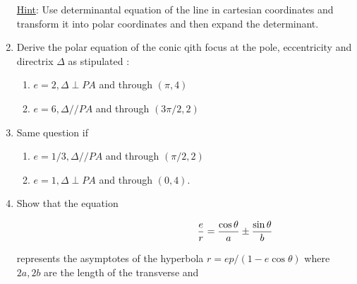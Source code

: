 \documentclass[11pt]{amsbook}
\begin{document}
\begin{enumerate}
\begin{equation*}
\end{equation*}


\underline{Hint}: Use determinantal  equation of the line in cartesian
coordinates 
and  transform it into polar coordinates and
 then expand the determinant. 

    
\item  Derive the polar equation of the conic qith focus at the pole, eccentricity and directrix $\Delta$ as stipulated :

\begin{enumerate}
    

\item $e=2, \Delta\perp PA $ and through $(\pi,4)$
        
\item  $e=6,\Delta//PA$ and through $(3\pi/2,2)$
         
         
\end{enumerate}
\item Same question if
\begin{enumerate}
    

\item $ e = 1/3, \Delta // PA $ and through $(\pi/2,2)$


\item $e=1,\Delta\perp PA $ and through $(0,4)$.

\end{enumerate}


\item Show that the equation 

\begin{equation*}
    
\hspace*{100pt}\dfrac{e}{r} = \dfrac{\cos \theta}{a} \pm \dfrac{\sin\theta}{b}

\end{equation*}

represents the asymptotes of the hyperbola $r=ep/(1-e\cos\theta)$  where  $2a, 2b$ are the length of the transverse and
    

\end{enumerate}
\end{document}

